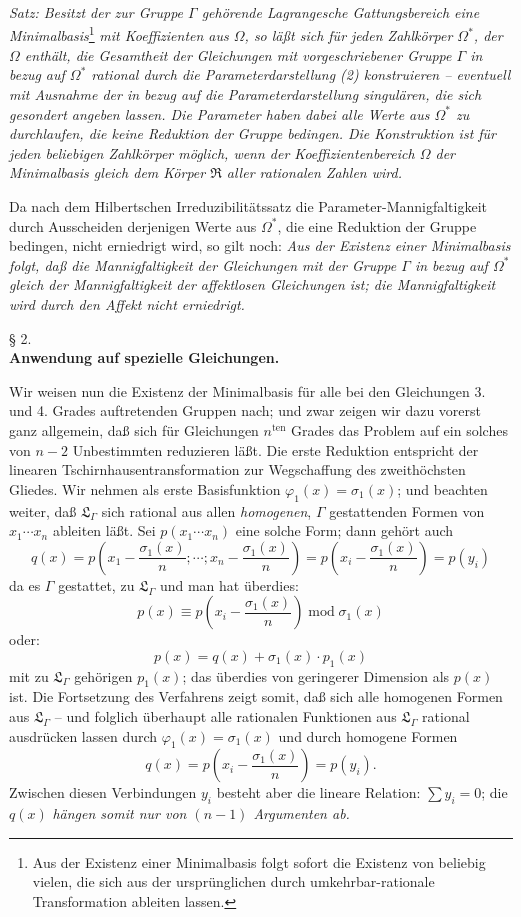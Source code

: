 \documentclass[11pt]{article}
\begin{document}
\emph{Satz: Besitzt der zur Gruppe $\Gamma$ gehörende Lagrangesche Gattungsbereich eine Minimalbasis}\footnote{Aus der Existenz einer Minimalbasis folgt sofort die Existenz von beliebig vielen, die sich aus der ursprünglichen durch umkehrbar-rationale Transformation ableiten lassen.} \emph{mit Koeffizienten aus $\Omega$, so läßt sich für jeden Zahlkörper $\Omega^*$, der $\Omega$ enthält, die Gesamtheit der Gleichungen mit vorgeschriebener Gruppe $\Gamma$ in bezug auf $\Omega^*$ rational durch die Parameterdarstellung (2) konstruieren -- eventuell mit Ausnahme der in bezug auf die Parameterdarstellung singulären, die sich gesondert angeben lassen. Die Parameter haben dabei alle Werte aus $\Omega^*$ zu durchlaufen, die keine Reduktion der Gruppe bedingen. Die Konstruktion ist für jeden beliebigen Zahlkörper möglich, wenn der Koeffizientenbereich $\Omega$ der Minimalbasis gleich dem Körper $\mathfrak R$ aller rationalen Zahlen wird.}

Da nach dem Hilbertschen Irreduzibilitätssatz die Parameter-Mannigfaltigkeit durch Ausscheiden derjenigen Werte aus $\Omega^*$, die eine Reduktion der Gruppe bedingen, nicht erniedrigt wird, so gilt noch: \emph{Aus der Existenz einer Minimalbasis folgt, daß die Mannigfaltigkeit der Gleichungen mit der Gruppe $\Gamma$ in bezug auf $\Omega^*$ gleich der Mannigfaltigkeit der affektlosen Gleichungen ist; die Mannigfaltigkeit wird durch den Affekt nicht erniedrigt.}

\begin{center}
§ 2.\\[0.75em]
\textbf{Anwendung auf spezielle Gleichungen.}
\end{center}

Wir weisen nun die Existenz der Minimalbasis für alle bei den Gleichungen 3. und 4. Grades auftretenden Gruppen nach; und zwar zeigen wir dazu vorerst ganz allgemein, daß sich für Gleichungen $n^{\text{ten}}$ Grades das Problem auf ein solches von $n-2$ Unbestimmten reduzieren läßt. Die erste Reduktion entspricht der linearen Tschirnhausentransformation zur Wegschaffung des zweithöchsten Gliedes. Wir nehmen als erste Basisfunktion $\varphi_1(x)=\sigma_1(x)$; und beachten weiter, daß $\mathfrak L_\Gamma$ sich rational aus allen \emph{homogenen}, $\Gamma$ gestattenden Formen von $x_1\cdots x_n$ ableiten läßt. Sei $p(x_1\cdots x_n)$ eine solche Form; dann gehört auch
\[
q(x)=p\left(x_1-\frac{\sigma_1(x)}{n};\cdots;x_n-\frac{\sigma_1(x)}{n}\right)=p\left(x_i-\frac{\sigma_1(x)}{n}\right)=p(y_i)
\]
da es $\Gamma$ gestattet, zu $\mathfrak L_\Gamma$ und man hat überdies:
\[
p(x)\equiv p\left(x_i-\frac{\sigma_1(x)}{n}\right)\operatorname{mod}\sigma_1(x)
\]
oder:
\[
p(x)=q(x)+\sigma_1(x)\cdot p_1(x)
\]
mit zu $\mathfrak L_\Gamma$ gehörigen $p_1(x)$; das überdies von geringerer Dimension als $p(x)$ ist. Die Fortsetzung des Verfahrens zeigt somit, daß sich alle homogenen Formen aus $\mathfrak L_\Gamma$ -- und folglich überhaupt alle rationalen Funktionen aus $\mathfrak L_\Gamma$ rational ausdrücken lassen durch $\varphi_1(x)=\sigma_1(x)$ und durch homogene Formen
\[
q(x)=p\left(x_i-\frac{\sigma_1(x)}{n}\right)=p(y_i).
\]
Zwischen diesen Verbindungen $y_i$ besteht aber die lineare Relation: $\sum y_i=0$; die $q(x)$ \emph{hängen somit nur von $(n-1)$ Argumenten ab.}
\end{document}
